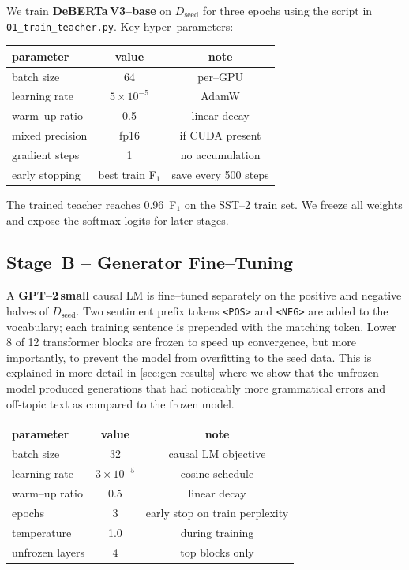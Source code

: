 \documentclass[11pt]{article}
\begin{document}
We train \textbf{DeBERTa\,V3--base} on $D_{\text{seed}}$
for three epochs using the script in
\texttt{01\_train\_teacher.py}.
Key hyper--parameters:

\begin{center}
  \begin{tabular}{@{}lcc@{}}
    \toprule
    parameter & value & note \\
    \midrule
    batch size          & 64        & per--GPU \\
    learning rate       & $5\times10^{-5}$ & AdamW \\
    warm--up ratio      & 0.5      & linear decay \\
    mixed precision     & fp16      & if CUDA present \\
    gradient steps      & 1         & no accumulation \\
    early stopping      & best train F$_1$ & save every 500 steps \\
    \bottomrule
  \end{tabular}
\end{center}

The trained teacher reaches 0.96~F$_1$ on the SST--2 train set.
We freeze all weights and expose the softmax logits for later stages.

\subsection{Stage~B -- Generator Fine--Tuning}
\label{sec:generator}

A \textbf{GPT--2\,small} causal LM is fine--tuned separately on the
positive and negative halves of $D_{\text{seed}}$.
Two sentiment prefix tokens \verb|<POS>| and \verb|<NEG>| are added to
the vocabulary; each training sentence is prepended with the matching
token.  Lower 8 of 12 transformer blocks are frozen to
speed up convergence, but more importantly, to prevent the model from
overfitting to the seed data. This is explained in more detail in
\ref{sec:gen-results} where we show that the unfrozen model produced
generations that had noticeably more grammatical errors and off-topic text as
compared to the frozen model.

\begin{center}
  \begin{tabular}{@{}lcc@{}}
    \toprule
    parameter & value & note \\
    \midrule
    batch size          & 32  & causal LM objective \\
    learning rate       & $3\times10^{-5}$ & cosine schedule \\
    warm--up ratio      & 0.5      & linear decay \\
    epochs              & 3  & early stop on train perplexity \\
    temperature         & 1.0 & during training \\
    unfrozen layers     & 4  & top blocks only \\
    \bottomrule
  \end{tabular}
\end{center}
\end{document}
